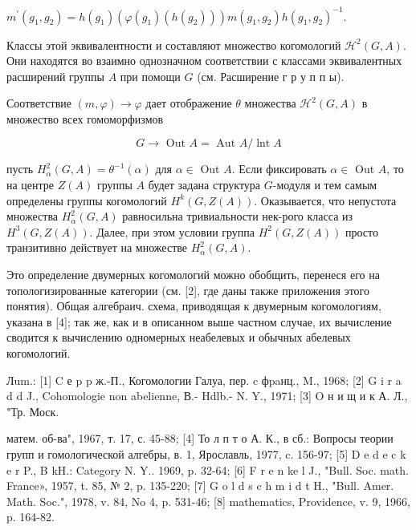 \documentclass[10pt]{article}
\begin{document}
$m^{\prime}\left(g_{1}, g_{2}\right)=h\left(g_{1}\right)\left(\varphi\left(g_{1}\right)\left(h\left(g_{2}\right)\right)\right) m\left(g_{1}, g_{2}\right) h\left(g_{1}, g_{2}\right)^{-1}$.



Классы этой эквивалентности и составляют множество когомологий $\mathscr{H}^{2}(G, A)$. Они находятся во взаимно однозначном соответствии с классами эквивалентных расширений группы $A$ при помощи $G$ (см. Расширение г р у п п ы).



Соответствие $(m, \varphi) \rightarrow \varphi$ дает отображение $\theta$ множества $\mathscr{H}^{2}(G, A)$ в множество всех гомоморфизмов



\[

G \longrightarrow \text { Out } A=\text { Aut } A / \operatorname{lnt} A

\]



пусть $H_{\alpha}^{2}(G, A)=\theta^{-1}(\alpha)$ для $\alpha \in$ Out $A$. Если фиксировать $\alpha \in$ Out $A$, то на центре $Z(A)$ группы $A$ будет задана структура $G$-модуля и тем самым определены группы когомологий $H^{k}(G, Z(A))$. Оказывается, что непустота множества $H_{\alpha}^{2}(G, A)$ равносильна тривиальности нек-рого класса из $H^{3}(G, Z(A))$. Далее, при этом условии группа $H^{2}(G, Z(A))$ просто транзитивно действует на множестве $H_{\alpha}^{2}(G, A)$.



Это определение двумерных когомологий можно обобщить, перенеся его на топологизированные категории (см. [2], где даны также приложения этого понятия). Общая алгебраич. схема, приводящая к двумерным когомологиям, указана в [4]; так же, как и в описанном выше частном случае, их вычисление сводится к вычислению одномерных неабелевых и обычных абелевых когомологий.



Лum.: [1] C е p p ж.-П., Когомологии Галуа, пер. c фpaнц., M., 1968; [2] G i r a d d J., Cohomologie non abelienne, В.- Hdlb.- N. Y., 1971; [3] O н и щ и к А. Л., "Тр. Моск.

матем. об-ва", 1967, т. 17, с. 45-88; [4] То л п т о А. К., в сб.: Вопросы теории групп и гомологической алгебры, в. 1, Ярославль, 1977, c. 156-97; [5] D e d e c k e r P., B kH.: Category N. Y.. 1969, p. 32-64; [6] F r e n ke l J., "Bull. Soc. math. France», 1957, t. 85, № 2, p. 135-220; [7] G o l d s c h m i d t H., "Bull. Amer. Math. Soc.", 1978, v. 84, No 4, p. 531-46; [8] mathematics, Providence, v. 9, 1966, p. 164-82.
\end{document}
